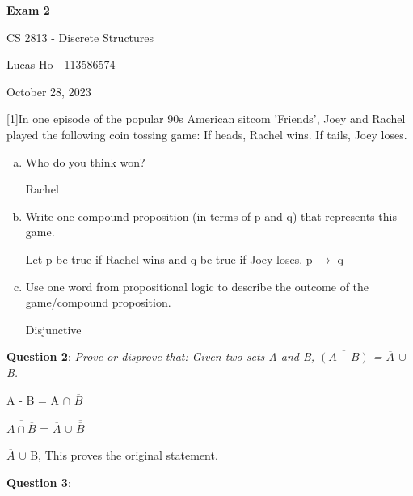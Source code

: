 \documentclass{article} %
\newcommand{\question}[2][]{\begin{flushleft}
        \textbf{Question #1}: \textit{#2}

\end{flushleft}}
\newcommand{\maketitletwo}[2][]{\begin{center}
        \Large{\textbf{Exam 2}
            
            CS 2813 - Discrete Structures} %
        \vspace{5pt}
        
        \normalsize{Lucas Ho - 113586574  %
        
        October 28, 2023}        %
        \vspace{15pt}
        
\end{center}}
\begin{document}
    \maketitletwo[5]  %
    
    \question[1]{In one episode of the popular 90s American sitcom ’Friends’, Joey and Rachel
    played the following coin tossing game: If heads, Rachel wins. If tails, Joey loses.}

    \begin{enumerate}[(a)]
      \item {Who do you think won?}
      
      Rachel
      \item {Write one compound proposition (in terms of p and q) that represents this game.}
      
      Let p be true if Rachel wins and q be true if Joey loses. p $\rightarrow$ q
      \item {Use one word from propositional logic to describe the outcome of the game/compound proposition.}
      
      Disjunctive
      
    \end{enumerate}

    \question[2]{Prove or disprove that: Given two sets A and B, $\overline{(A - B)}$ = $\overline{A}$ $\cup$ B.}

    A - B = A $\cap$ $\overline{B}$

    $\overline{A \cap \overline{B}}$ = $\overline{A}$ $\cup$ $\overline{\overline{B}}$

    $\overline{A}$ $\cup$ B, This proves the original statement.

    \question[3]{}
\end{document}
